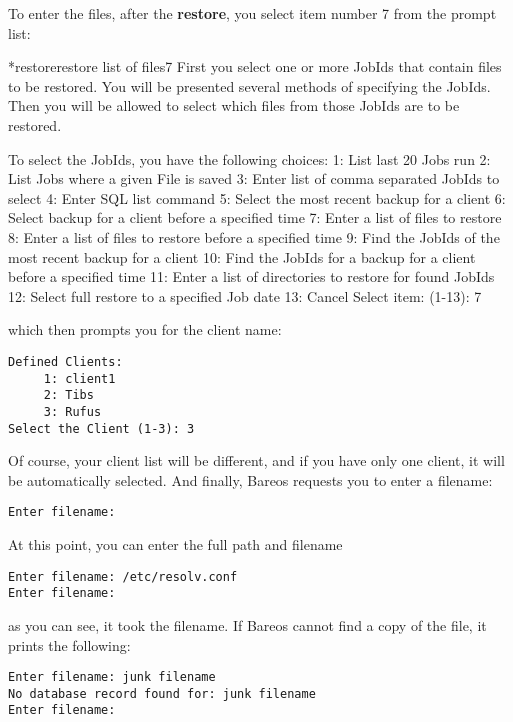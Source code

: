 To enter the files, after the {\bf restore}, you select item number 7 from the
prompt list:

\begin{bconsole}{*}{restore}{restore list of files}{7}
First you select one or more JobIds that contain files
to be restored. You will be presented several methods
of specifying the JobIds. Then you will be allowed to
select which files from those JobIds are to be restored.

To select the JobIds, you have the following choices:
     1: List last 20 Jobs run
     2: List Jobs where a given File is saved
     3: Enter list of comma separated JobIds to select
     4: Enter SQL list command
     5: Select the most recent backup for a client
     6: Select backup for a client before a specified time
     7: Enter a list of files to restore
     8: Enter a list of files to restore before a specified time
     9: Find the JobIds of the most recent backup for a client
    10: Find the JobIds for a backup for a client before a specified time
    11: Enter a list of directories to restore for found JobIds
    12: Select full restore to a specified Job date
    13: Cancel
Select item:  (1-13): 7
\end{bconsole}


which then prompts you for the client name:

\footnotesize
\begin{verbatim}
Defined Clients:
     1: client1
     2: Tibs
     3: Rufus
Select the Client (1-3): 3
\end{verbatim}
\normalsize

Of course, your client list will be different, and if you have only one
client, it will be automatically selected. And finally, Bareos requests you to
enter a filename:

\footnotesize
\begin{verbatim}
Enter filename:
\end{verbatim}
\normalsize

At this point, you can enter the full path and filename

\footnotesize
\begin{verbatim}
Enter filename: /etc/resolv.conf
Enter filename:
\end{verbatim}
\normalsize

as you can see, it took the filename. If Bareos cannot find a copy of the
file, it prints the following:

\footnotesize
\begin{verbatim}
Enter filename: junk filename
No database record found for: junk filename
Enter filename:
\end{verbatim}
\normalsize

